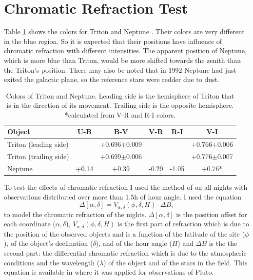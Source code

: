 \documentclass[12pt,a4paper]{report}
\begin{document}
\section*{Chromatic Refraction Test}

Table \ref{Tab:colors} shows the colors for Triton \citep{Pascu2006} and Neptune \cite{Schmude2016}. Their colors are very different in the blue region. So it is expected that their positions have influence of chromatic refraction with different intensities. The apparent position of Neptune, which is more blue than Triton, would be more shifted towards the zenith than the Triton's position. There may also be noted that in 1992 Neptune had just exited the galactic plane, so the reference stars were redder due to dust.

\begin{table}[h]
\centering
\begin{tabular}{|l|c|c|c|c|c|}
\hline
Object & U-B & B-V & V-R & R-I & V-I\\
\hline
Triton (leading side) & & +0.696$\pm$0.009 & & & +0.766$\pm$0.006 \\
Triton (trailing side) & & +0.699$\pm$0.006 & & & +0.776$\pm$0.007 \\
Neptune & +0.14 & +0.39 & -0.29 & -1.05 & +0.76*\\
\hline
\end{tabular}
\caption{Colors of Triton and Neptune. Leading side is the hemisphere of Triton that is in the direction of its movement. Trailing side is the opposite hemisphere. *calculated from V-R and R-I colors.}
\label{Tab:colors}
\end{table}

To test the effects of chromatic refraction I used the method of \cite{Benedetti-Rossi2014} on all nights with observations distributed over more than 1.5h of hour angle. I used the equation \:
\begin{equation}
\Delta [\alpha, \delta] = V_{\alpha,\delta} (\phi,\delta, H) \cdot \Delta B,
\label{Eq:refraction}
\end{equation}
to model the chromatic refraction of the nights. $\Delta [\alpha, \delta]$ is the position offset for each coordinate ($\alpha, \delta$), $V_{\alpha,\delta} (\phi,\delta, H)$ is the first part of refraction which is due to the position of the observed objects and is a function of the latitude of the site ($\phi$), of the object’s declination ($\delta$), and of the hour angle ($H$) and $\Delta B$ is the the second part: the differential chromatic refraction which is due to the atmospheric conditions and the wavelength ($\lambda$) of the object and of the stars in the field. This equation is available in \cite{Benedetti-Rossi2014} where it was applied for observations of Pluto.
\end{document}
